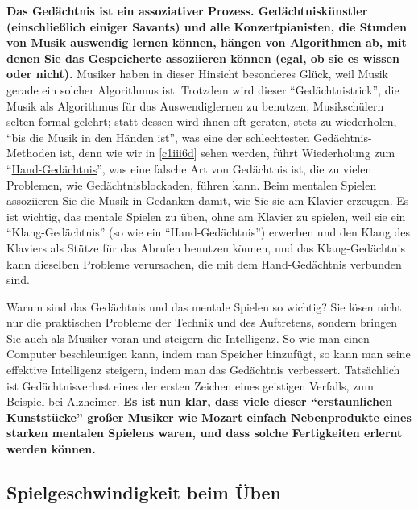 \textbf{Das Gedächtnis ist ein assoziativer Prozess.
Gedächtniskünstler (einschließlich einiger Savants) und alle Konzertpianisten, die Stunden von Musik auswendig lernen können, hängen von Algorithmen ab, mit denen Sie das Gespeicherte assoziieren können (egal, ob sie es wissen oder nicht).}
Musiker haben in dieser Hinsicht besonderes Glück, weil Musik gerade ein solcher Algorithmus ist.
Trotzdem wird dieser \enquote{Gedächtnistrick}, die Musik als Algorithmus für das Auswendiglernen zu benutzen, Musikschülern selten formal gelehrt; statt dessen wird ihnen oft geraten, stets zu wiederholen, \enquote{bis die Musik in den Händen ist}, was eine der schlechtesten Gedächtnis-Methoden ist, denn wie wir in \hyperref[c1iii6d]{\autoref{c1iii6d}} sehen werden, führt Wiederholung zum \enquote{\hyperref[c1iii6d]{Hand-Gedächtnis}}, was eine falsche Art von Gedächtnis ist, die zu vielen Problemen, wie Gedächtnisblockaden, führen kann.
Beim mentalen Spielen assoziieren Sie die Musik in Gedanken damit, wie Sie sie am Klavier erzeugen.
Es ist wichtig, das mentale Spielen zu üben, ohne am Klavier zu spielen, weil sie ein \enquote{Klang-Gedächtnis} (so wie ein \enquote{Hand-Gedächtnis}) erwerben und den Klang des Klaviers als Stütze für das Abrufen benutzen können, und das Klang-Gedächtnis kann dieselben Probleme verursachen, die mit dem Hand-Gedächtnis verbunden sind.

Warum sind das Gedächtnis und das mentale Spielen so wichtig?
Sie lösen nicht nur die praktischen Probleme der Technik und des \hyperref[c1iii14]{Auftretens}, sondern bringen Sie auch als Musiker voran und steigern die Intelligenz.
So wie man einen Computer beschleunigen kann, indem man Speicher hinzufügt, so kann man seine effektive Intelligenz steigern, indem man das Gedächtnis verbessert.
Tatsächlich ist Gedächtnisverlust eines der ersten Zeichen eines geistigen Verfalls, zum Beispiel bei Alzheimer.
\textbf{Es ist nun klar, dass viele dieser \enquote{erstaunlichen Kunststücke} großer Musiker wie Mozart einfach Nebenprodukte eines starken mentalen Spielens waren, und dass solche Fertigkeiten erlernt werden können.}


\subsection{Spielgeschwindigkeit beim Üben}
\label{c1ii13}

